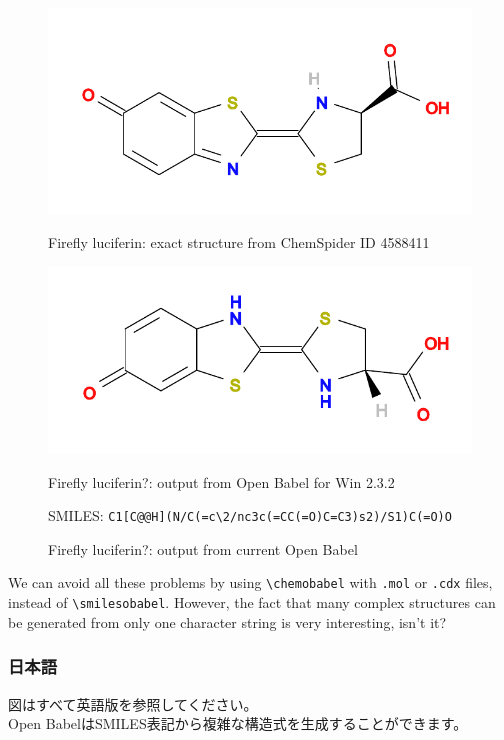 \documentclass[12pt]{ltjsarticle}
\begin{document}
\begin{figure}[ht]
  \centering
  \includegraphics[scale=0.6]{figures/Exact-FireflyLuciferin.pdf}
  \caption{Firefly luciferin: exact structure from ChemSpider ID 4588411}
  \includegraphics[scale=0.6]{figures/Win232-FireflyLuciferin.pdf}
  \caption{Firefly luciferin?: output from Open Babel for Win 2.3.2}
  \caption{Firefly luciferin?: output from current Open Babel}
  SMILES: \verb|C1[C@@H](N/C(=c\2/nc3c(=CC(=O)C=C3)s2)/S1)C(=O)O|
\end{figure}

We can avoid all these problems by using \verb|\chemobabel| with \verb|.mol| or
\verb|.cdx| files, instead of \verb|\smilesobabel|.
However, the fact that many complex structures can be generated from
only one character string is very interesting, isn't it?

\subsubsection{日本語}

図はすべて英語版を参照してください。 \\

Open BabelはSMILES表記から複雑な構造式を生成することができます。
\end{document}

